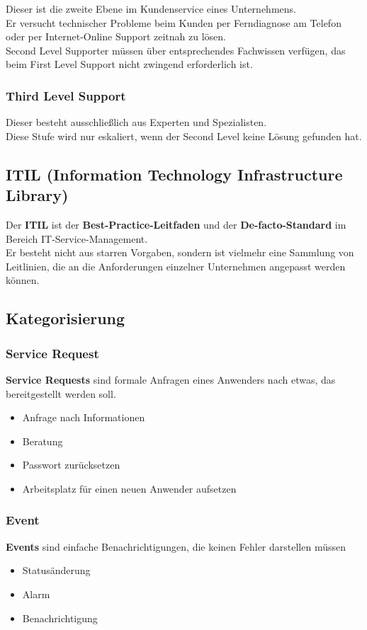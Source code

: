 \documentclass[asp1.tex]{subfiles}
\begin{document}
Dieser ist die zweite Ebene im Kundenservice eines Unternehmens. \\
Er versucht technischer Probleme beim Kunden per Ferndiagnose am Telefon oder per Internet-Online Support zeitnah zu lösen. \\
Second Level Supporter müssen über entsprechendes Fachwissen verfügen, das beim First Level Support nicht zwingend erforderlich ist.


\subsubsection{Third Level Support}

Dieser besteht ausschließlich aus Experten und Spezialisten. \\
Diese Stufe wird nur eskaliert, wenn der Second Level keine Lösung gefunden hat.


\subsection{ITIL  (Information Technology Infrastructure Library)}

Der \textbf{ITIL}  ist der \textbf{Best-Practice-Leitfaden} und der \textbf{De-facto-Standard} im Bereich IT-Service-Management. \\
Er besteht nicht aus starren Vorgaben, sondern ist vielmehr eine Sammlung von Leitlinien, die an die Anforderungen einzelner Unternehmen angepasst werden können.
\subsection{Kategorisierung}
\subsubsection{Service Request}

\textbf{Service Requests} sind formale Anfragen eines Anwenders nach etwas, das bereitgestellt werden soll. \\
\begin{itemize}
    \item Anfrage nach Informationen
    \item Beratung
    \item Passwort zurücksetzen
    \item Arbeitsplatz für einen neuen Anwender aufsetzen
\end{itemize}

\subsubsection{Event}
\textbf{Events} sind einfache Benachrichtigungen, die keinen Fehler darstellen müssen \\
\begin{itemize}
    \item Statusänderung
    \item Alarm
    \item Benachrichtigung
\end{itemize}
\end{document}

